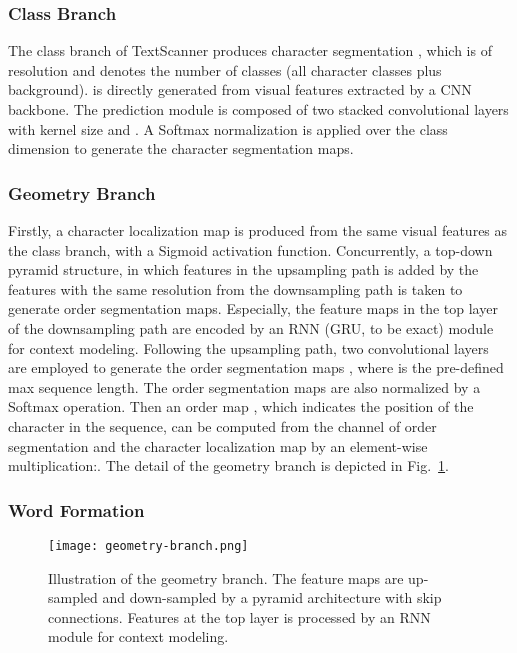 \documentclass[letterpaper]{article} \usepackage{aaai20}  \usepackage{times}  \usepackage{helvet} \usepackage{courier}  \usepackage[hyphens]{url}  \usepackage{graphicx} \urlstyle{rm} \def\UrlFont{\rm}  \usepackage{graphicx}  \frenchspacing  \setlength{\pdfpagewidth}{8.5in}  \setlength{\pdfpageheight}{11in}
\begin{document}
\subsubsection{Class Branch}
The class branch of TextScanner produces character segmentation , which is of resolution  and  denotes the number of classes (all character classes plus background).  is directly generated from visual features extracted by a CNN backbone. The prediction module is composed of two stacked convolutional layers with kernel size  and . A Softmax normalization is applied over the class dimension to generate the character segmentation maps.


\subsubsection{Geometry Branch} 

Firstly, a character localization map  is produced from the same visual features as the class branch, with a Sigmoid activation function. Concurrently, a top-down pyramid structure, in which features in the upsampling path is added by the features with the same resolution from the downsampling path is taken to generate order segmentation maps. Especially, the feature maps in the top layer of the downsampling path are encoded by an RNN (GRU\cite{GRU}, to be exact) module for context modeling. Following the upsampling path, two convolutional layers are employed to generate the order segmentation maps , where  is the pre-defined max sequence length. The order segmentation maps are also normalized by a Softmax operation. Then an order map , which indicates the position of the  character in the sequence, can be computed from the  channel of order segmentation and the character localization map  by an element-wise multiplication:.
The detail of the geometry branch is depicted in Fig.~\ref{fig:order}.

\subsubsection{Word Formation}

\begin{figure}[t]
\centering
\texttt{[image: geometry-branch.png]}
\caption
{Illustration of the geometry branch. The feature maps are up-sampled and down-sampled by a pyramid architecture with skip connections. Features at the top layer is processed by an RNN module for context modeling.}
\label{fig:order}
\end{figure}
\end{document}
